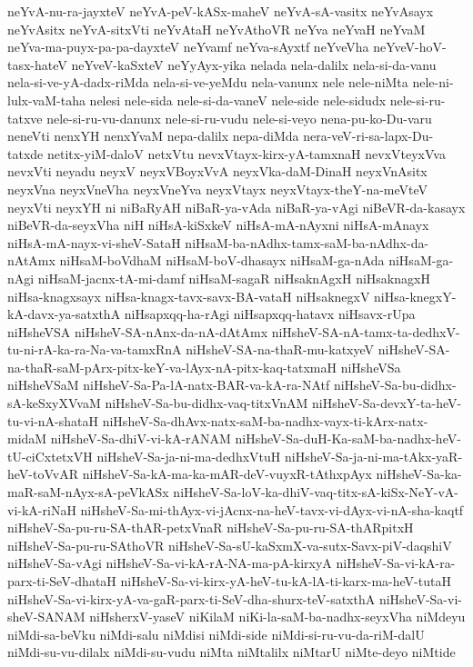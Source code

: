 {neYvA-nu-ra-jayxteV
neYvA-peV-kASx-maheV
neYvA-sA-vasitx
neYvAsayx
neYvAsitx
neYvA-sitxVti
neYvAtaH
neYvAthoVR
neYva
neYvaH
neYvaM
neYva-ma-puyx-pa-pa-dayxteV
neYvamf
neYva-sAyxtf
neYveVha
neYveV-hoV-tasx-hateV
neYveV-kaSxteV
neYyAyx-yika
nelada
nela-dalilx
nela-si-da-vanu
nela-si-ve-yA-dadx-riMda
nela-si-ve-yeMdu
nela-vanunx
nele
nele-niMta
nele-ni-lulx-vaM-taha
nelesi
nele-sida
nele-si-da-vaneV
nele-side
nele-sidudx
nele-si-ru-tatxve
nele-si-ru-vu-danunx
nele-si-ru-vudu
nele-si-veyo
nena-pu-ko-Du-varu
neneVti
nenxYH
nenxYvaM
nepa-dalilx
nepa-diMda
nera-veV-ri-sa-lapx-Du-tatxde
netitx-yiM-daloV
netxVtu
nevxVtayx-kirx-yA-tamxnaH
nevxVteyxVva
nevxVti
neyadu
neyxV
neyxVBoyxVvA
neyxVka-daM-DinaH
neyxVnAsitx
neyxVna
neyxVneVha
neyxVneYva
neyxVtayx
neyxVtayx-theY-na-meVteV
neyxVti
neyxYH
ni
niBaRyAH
niBaR-ya-vAda
niBaR-ya-vAgi
niBeVR-da-kasayx
niBeVR-da-seyxVha
niH
niHsA-kiSxkeV
niHsA-mA-nAyxni
niHsA-mAnayx
niHsA-mA-nayx-vi-sheV-SataH
niHsaM-ba-nAdhx-tamx-saM-ba-nAdhx-da-nAtAmx
niHsaM-boVdhaM
niHsaM-boV-dhasayx
niHsaM-ga-nAda
niHsaM-ga-nAgi
niHsaM-jacnx-tA-mi-damf
niHsaM-sagaR
niHsaknAgxH
niHsaknagxH
niHsa-knagxsayx
niHsa-knagx-tavx-savx-BA-vataH
niHsaknegxV
niHsa-knegxY-kA-davx-ya-satxthA
niHsapxqq-ha-rAgi
niHsapxqq-hatavx
niHsavx-rUpa
niHsheVSA
niHsheV-SA-nAnx-da-nA-dAtAmx
niHsheV-SA-nA-tamx-ta-dedhxV-tu-ni-rA-ka-ra-Na-va-tamxRnA
niHsheV-SA-na-thaR-mu-katxyeV
niHsheV-SA-na-thaR-saM-pArx-pitx-keY-va-lAyx-nA-pitx-kaq-tatxmaH
niHsheVSa
niHsheVSaM
niHsheV-Sa-Pa-lA-natx-BAR-va-kA-ra-NAtf
niHsheV-Sa-bu-didhx-sA-keSxyXVvaM
niHsheV-Sa-bu-didhx-vaq-titxVnAM
niHsheV-Sa-devxY-ta-heV-tu-vi-nA-shataH
niHsheV-Sa-dhAvx-natx-saM-ba-nadhx-vayx-ti-kArx-natx-midaM
niHsheV-Sa-dhiV-vi-kA-rANAM
niHsheV-Sa-duH-Ka-saM-ba-nadhx-heV-tU-ciCxtetxVH
niHsheV-Sa-ja-ni-ma-dedhxVtuH
niHsheV-Sa-ja-ni-ma-tAkx-yaR-heV-toVvAR
niHsheV-Sa-kA-ma-ka-mAR-deV-vuyxR-tAthxpAyx
niHsheV-Sa-ka-maR-saM-nAyx-sA-peVkASx
niHsheV-Sa-loV-ka-dhiV-vaq-titx-sA-kiSx-NeY-vA-vi-kA-riNaH
niHsheV-Sa-mi-thAyx-vi-jAcnx-na-heV-tavx-vi-dAyx-vi-nA-sha-kaqtf
niHsheV-Sa-pu-ru-SA-thAR-petxVnaR
niHsheV-Sa-pu-ru-SA-thARpitxH
niHsheV-Sa-pu-ru-SAthoVR
niHsheV-Sa-sU-kaSxmX-va-sutx-Savx-piV-daqshiV
niHsheV-Sa-vAgi
niHsheV-Sa-vi-kA-rA-NA-ma-pA-kirxyA
niHsheV-Sa-vi-kA-ra-parx-ti-SeV-dhataH
niHsheV-Sa-vi-kirx-yA-heV-tu-kA-lA-ti-karx-ma-heV-tutaH
niHsheV-Sa-vi-kirx-yA-va-gaR-parx-ti-SeV-dha-shurx-teV-satxthA
niHsheV-Sa-vi-sheV-SANAM
niHsherxV-yaseV
niKilaM
niKi-la-saM-ba-nadhx-seyxVha
niMdeyu
niMdi-sa-beVku
niMdi-salu
niMdisi
niMdi-side
niMdi-si-ru-vu-da-riM-dalU
niMdi-su-vu-dilalx
niMdi-su-vudu
niMta
niMtalilx
niMtarU
niMte-deyo
niMtide
}
